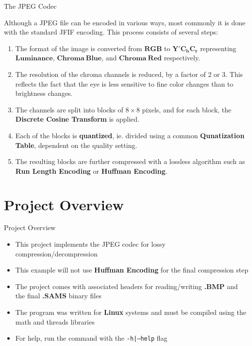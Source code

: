 \documentclass[10pt]{beamer}
\begin{document}
\begin{frame}{The JPEG Codec}

    Although a JPEG file can be encoded in various ways, most commonly it is done with the standard JFIF encoding. This process consists of several steps:
    \begin{enumerate}
     \item The format of the image is converted from $\bm{RGB}$ to  $\bm{Y'C_bC_r}$ representing $\bm{Luminance}$, $\bm{Chroma\ Blue}$, and $\bm{Chroma\ Red}$ respectively.
     \item The resolution of the chroma channels is reduced, by a factor of 2 or 3. This reflects the fact that the eye is less sensitive to fine color changes than to brightness changes.
     \item The channels are split into blocks of $8\times8$ pixels, and for each block, the \textbf{Discrete Cosine Transform} is applied.
     \item Each of the blocks is \textbf{quantized}, ie. divided using a common \textbf{Qunatization Table}, dependent on the quality setting.
     \item The resulting blocks are further compressed with a lossless algorithm such as \textbf{Run Length Encoding} or \textbf{Huffman Encoding}.
    \end{enumerate}

\end{frame}


\section{Project Overview}

\begin{frame}{Project Overview}
    \begin{itemize}
     \item This project implements the JPEG codec for lossy compression/decompression
     \item This example will not use \textbf{Huffman Encoding} for the final compression step
     \item The project comes with associated headers for reading/writing \textbf{.BMP} and the final \textbf{.SAMS} binary files
     \item The program was written for \textbf{Linux} systems and must be compiled using the math and threads libraries
     \item For help, run the command with the \texttt{-h|--help} flag
    \end{itemize}
\end{frame}
\end{document}
